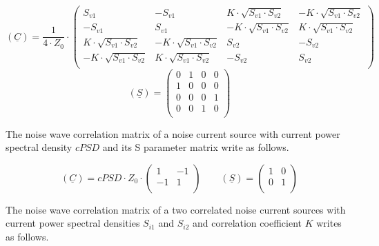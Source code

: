 \begin{equation}
(\underline{C}) = \frac{1}{4\cdot Z_0}\cdot
\begin{pmatrix}
 S_{v1} & -S_{v1} &  K\cdot\sqrt{S_{v1}\cdot S_{v2}} & -K\cdot\sqrt{S_{v1}\cdot S_{v2}} \\
-S_{v1} &  S_{v1} & -K\cdot\sqrt{S_{v1}\cdot S_{v2}} &  K\cdot\sqrt{S_{v1}\cdot S_{v2}} \\
 K\cdot\sqrt{S_{v1}\cdot S_{v2}} & -K\cdot\sqrt{S_{v1}\cdot S_{v2}} &  S_{v2} & -S_{v2} \\
-K\cdot\sqrt{S_{v1}\cdot S_{v2}} &  K\cdot\sqrt{S_{v1}\cdot S_{v2}} & -S_{v2} &  S_{v2} \\
\end{pmatrix}
\end{equation}
\begin{equation}
(\underline{S}) =
\begin{pmatrix}
 0 & 1 & 0 & 0 \\
 1 & 0 & 0 & 0 \\
 0 & 0 & 0 & 1 \\
 0 & 0 & 1 & 0 \\
\end{pmatrix}
\end{equation}

The noise wave correlation matrix of a noise current source with
current power spectral density $cPSD$ and its S parameter matrix
write as follows.

\begin{equation}
(\underline{C}) = cPSD\cdot Z_0\cdot
\begin{pmatrix}
   1 & -1\\
  -1 &  1\\
\end{pmatrix}
\qquad
(\underline{S}) =
\begin{pmatrix}
   1 &  0\\
   0 &  1\\
\end{pmatrix}
\end{equation}

The noise wave correlation matrix of a two correlated noise current
sources with current power spectral densities $S_{i1}$ and $S_{i2}$
and correlation coefficient $K$ writes as follows.

